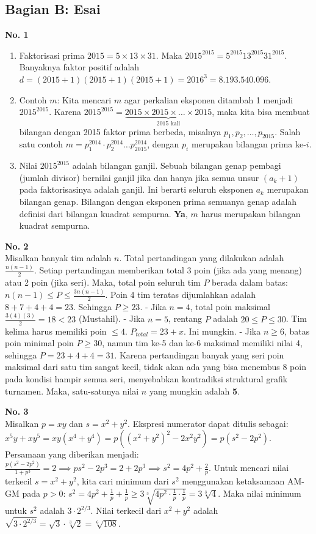\documentclass[11pt, a4paper]{article}
\begin{document}
\subsection*{Bagian B: Esai}

\textbf{No. 1}
\begin{enumerate}[label=\arabic*.]
    \item Faktorisasi prima $2015 = 5 \times 13 \times 31$.
    Maka $2015^{2015} = 5^{2015} 13^{2015} 31^{2015}$.
    Banyaknya faktor positif adalah $d = (2015+1)(2015+1)(2015+1) = 2016^3 = 8.193.540.096$.
    \item Contoh $m$: Kita mencari $m$ agar perkalian eksponen ditambah 1 menjadi $2015^{2015}$.
    Karena $2015^{2015} = \underbrace{2015 \times 2015 \times \dots \times 2015}_{2015 \text{ kali}}$, maka kita bisa membuat bilangan dengan 2015 faktor prima berbeda, misalnya $p_1, p_2, \dots, p_{2015}$.
    Salah satu contoh $m = p_1^{2014} \cdot p_2^{2014} \dots p_{2015}^{2014}$, dengan $p_i$ merupakan bilangan prima ke-$i$.
    \item Nilai $2015^{2015}$ adalah bilangan ganjil. Sebuah bilangan genap pembagi (jumlah divisor) bernilai ganjil jika dan hanya jika semua unsur $(a_k + 1)$ pada faktorisasinya adalah ganjil.
    Ini berarti seluruh eksponen $a_k$ merupakan bilangan genap. Bilangan dengan eksponen prima semuanya genap adalah definisi dari bilangan kuadrat sempurna. \textbf{Ya}, $m$ harus merupakan bilangan kuadrat sempurna.
\end{enumerate}

\textbf{No. 2}\\
Misalkan banyak tim adalah $n$. Total pertandingan yang dilakukan adalah $\frac{n(n-1)}{2}$.
Setiap pertandingan memberikan total 3 poin (jika ada yang menang) atau 2 poin (jika seri).
Maka, total poin seluruh tim $P$ berada dalam batas: $n(n-1) \le P \le \frac{3n(n-1)}{2}$.
Poin 4 tim teratas dijumlahkan adalah $8 + 7 + 4 + 4 = 23$. Sehingga $P \ge 23$.
- Jika $n=4$, total poin maksimal $\frac{3(4)(3)}{2} = 18 < 23$ (Mustahil).
- Jika $n=5$, rentang $P$ adalah $20 \le P \le 30$. Tim kelima harus memiliki poin $\le 4$. $P_{total} = 23 + x$. Ini mungkin.
- Jika $n \ge 6$, batas poin minimal poin $P \ge 30$, namun tim ke-5 dan ke-6 maksimal memiliki nilai 4, sehingga $P = 23 + 4 + 4 = 31$. Karena pertandingan banyak yang seri poin maksimal dari satu tim sangat kecil, tidak akan ada yang bisa menembus 8 poin pada kondisi hampir semua seri, menyebabkan kontradiksi struktural grafik turnamen.
Maka, satu-satunya nilai $n$ yang mungkin adalah \textbf{5}.

\textbf{No. 3}\\
Misalkan $p = xy$ dan $s = x^2 + y^2$. Ekspresi numerator dapat ditulis sebagai:
$x^5y + xy^5 = xy(x^4 + y^4) = p((x^2+y^2)^2 - 2x^2y^2) = p(s^2 - 2p^2)$.
Persamaan yang diberikan menjadi: $\frac{p(s^2 - 2p^2)}{1 + p^3} = 2 \implies ps^2 - 2p^3 = 2 + 2p^3 \implies s^2 = 4p^2 + \frac{2}{p}$.
Untuk mencari nilai terkecil $s = x^2+y^2$, kita cari minimum dari $s^2$ menggunakan ketaksamaan AM-GM pada $p > 0$:
$s^2 = 4p^2 + \frac{1}{p} + \frac{1}{p} \ge 3 \sqrt[3]{4p^2 \cdot \frac{1}{p} \cdot \frac{1}{p}} = 3 \sqrt[3]{4}$.
Maka nilai minimum untuk $s^2$ adalah $3 \cdot 2^{2/3}$.
Nilai terkecil dari $x^2 + y^2$ adalah $\sqrt{3 \cdot 2^{2/3}} = \sqrt{3} \cdot \sqrt[3]{2} = \sqrt[6]{108}$.
\end{document}
